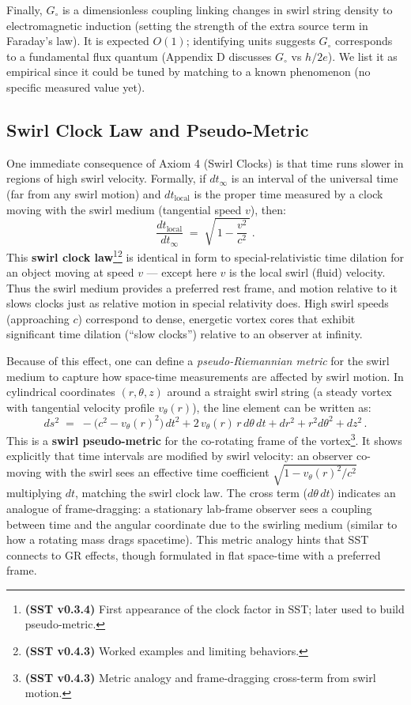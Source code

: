 \documentclass[reprint,aps,onecolumn,nofootinbib]{revtex4-2}
\begin{document}
    Finally, $G_{\circ}$ is a dimensionless coupling linking changes in swirl string density to electromagnetic induction (setting the strength of the extra source term in Faraday’s law). It is expected $O(1)$; identifying units suggests $G_{\circ}$ corresponds to a fundamental flux quantum (Appendix D discusses $G_{\circ}$ vs $h/2e$). We list it as empirical since it could be tuned by matching to a known phenomenon (no specific measured value yet).

    \subsection*{Swirl Clock Law and Pseudo-Metric}
        One immediate consequence of Axiom 4 (Swirl Clocks) is that time runs slower in regions of high swirl velocity. Formally, if $dt_{\infty}$ is an interval of the universal time (far from any swirl motion) and $dt_{\text{local}}$ is the proper time measured by a clock moving with the swirl medium (tangential speed $v$), then:
        \[
            \frac{dt_{\text{local}}}{dt_{\infty}} \;=\; \sqrt{\,1 - \frac{v^2}{c^2}\,}\,.
        \]
        This \textbf{swirl clock law}\footnote{\textbf{(SST v0.3.4)} First appearance of the clock factor in SST; later used to build pseudo-metric.}\footnote{\textbf{(SST v0.4.3)} Worked examples and limiting behaviors.} is identical in form to special-relativistic time dilation for an object moving at speed $v$ — except here $v$ is the local swirl (fluid) velocity. Thus the swirl medium provides a preferred rest frame, and motion relative to it slows clocks just as relative motion in special relativity does. High swirl speeds (approaching $c$) correspond to dense, energetic vortex cores that exhibit significant time dilation (“slow clocks”) relative to an observer at infinity.

        Because of this effect, one can define a \emph{pseudo-Riemannian metric} for the swirl medium to capture how space-time measurements are affected by swirl motion. In cylindrical coordinates $(r,\theta,z)$ around a straight swirl string (a steady vortex with tangential velocity profile $v_{\theta}(r)$), the line element can be written as:
        \[
            ds^2 \;=\; -\big(c^2 - v_{\theta}(r)^2\big)\,dt^2 + 2\,v_{\theta}(r)\,r\,d\theta\,dt + dr^2 + r^2 d\theta^2 + dz^2\,.
        \]
        This is a \textbf{swirl pseudo-metric} for the co-rotating frame of the vortex\footnote{\textbf{(SST v0.4.3)} Metric analogy and frame-dragging cross-term from swirl motion.}. It shows explicitly that time intervals are modified by swirl velocity: an observer co-moving with the swirl sees an effective time coefficient $\sqrt{1 - v_{\theta}(r)^2/c^2}$ multiplying $dt$, matching the swirl clock law. The cross term ($d\theta\,dt$) indicates an analogue of frame-dragging: a stationary lab-frame observer sees a coupling between time and the angular coordinate due to the swirling medium (similar to how a rotating mass drags spacetime). This metric analogy hints that SST connects to GR effects, though formulated in flat space-time with a preferred frame.
\end{document}
